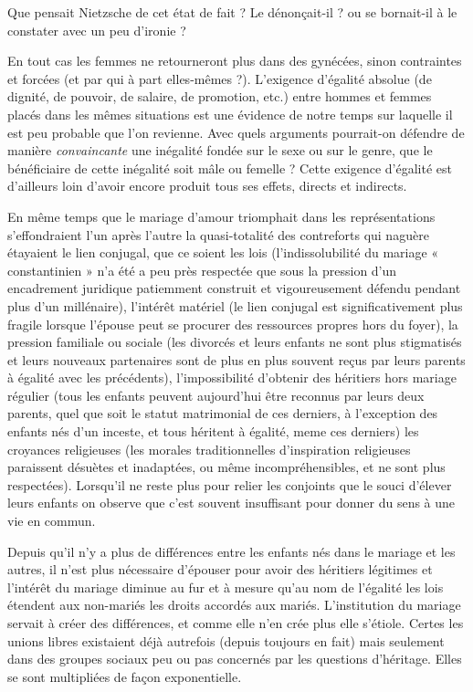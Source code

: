 Que pensait Nietzsche de cet état de fait ? Le dénonçait-il ? ou se bornait-il à le constater avec un peu d'ironie ?

En tout cas les femmes ne retourneront plus dans des gynécées, sinon contraintes et forcées (et par qui à part elles-mêmes ?). L'exigence d'égalité absolue (de dignité, de pouvoir, de salaire, de promotion, etc.) entre hommes et femmes placés dans les mêmes situations est une évidence de notre temps sur laquelle il est peu probable que l'on revienne. Avec quels arguments pourrait-on défendre de manière \emph{convaincante} une inégalité fondée sur le sexe ou sur le genre, que le bénéficiaire de cette inégalité soit mâle ou femelle ? Cette exigence d'égalité est d'ailleurs loin d'avoir encore produit tous ses effets, directs et indirects. 


 
 En même temps que le mariage d’amour triomphait dans les représentations s’effondraient l’un après l’autre la quasi-totalité des contreforts qui naguère étayaient le lien conjugal, que ce soient les lois (l'indissolubilité du mariage « constantinien » n’a été a peu près respectée que sous la pression d’un encadrement juridique patiemment construit et vigoureusement défendu pendant plus d'un millénaire), l'intérêt matériel (le lien conjugal est significativement plus fragile lorsque l'épouse peut se procurer des ressources propres hors du foyer), la pression familiale ou sociale (les divorcés et leurs enfants ne sont plus stigmatisés et leurs nouveaux partenaires sont de plus en plus souvent reçus par leurs parents à égalité avec les précédents), l’impossibilité d’obtenir des héritiers hors mariage régulier (tous les enfants peuvent aujourd’hui être reconnus par leurs deux parents,  quel que soit le statut matrimonial de ces derniers, à l'exception des enfants nés d'un inceste, et tous héritent à égalité, meme ces derniers) les croyances religieuses (les morales traditionnelles d'inspiration religieuses  paraissent désuètes et inadaptées, ou même incompréhensibles, et ne sont plus respectées). Lorsqu'il ne reste plus pour relier les conjoints que le souci d’élever leurs enfants on observe que c'est souvent insuffisant pour donner du sens à une vie en commun.

 
 Depuis qu'il n'y a plus de différences entre les enfants nés dans le mariage et les autres, il n'est plus nécessaire d'épouser pour avoir des héritiers légitimes et l'intérêt du mariage diminue au fur et à mesure qu'au nom de l'égalité les lois étendent aux non-mariés les droits accordés aux mariés. L’institution du mariage servait à créer des différences, et comme elle n’en crée plus elle s'étiole. Certes les unions libres existaient déjà autrefois (depuis toujours en fait) mais seulement dans des groupes sociaux peu ou pas concernés par les questions d’héritage. Elles se sont multipliées de façon exponentielle. 
 
